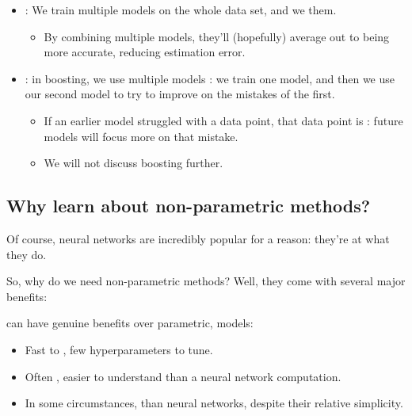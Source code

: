         \begin{itemize}
            \item {}: We train multiple models on the whole data set, and we  them.

            \begin{itemize}
                \item By combining multiple models, they'll (hopefully) average out to being more accurate, reducing estimation error.
            \end{itemize}
            
            \item {}: in boosting, we use multiple models : we train one model, and then we use our second model to try to improve on the mistakes of the first.

            \begin{itemize}
                \item If an earlier model struggled with a data point, that data point is : future models will focus more on that mistake.
                \item We will not discuss boosting further.
            \end{itemize}
            
        \end{itemize}





    
    
    \phantom{}

    
    \subsection{Why learn about non-parametric methods?}

        Of course, neural networks are incredibly popular for a reason: they're  at what they do.

        So, why do we need non-parametric methods? Well, they come with several major benefits:\\

        \begin{concept}
             can have genuine benefits over parametric,  models:

            \begin{itemize}
                \item Fast to , few hyperparameters to tune.
                
                \item Often , easier to understand than a neural network computation.

                \item In some circumstances,  than neural networks, despite their relative simplicity.
            \end{itemize}
        \end{concept}


